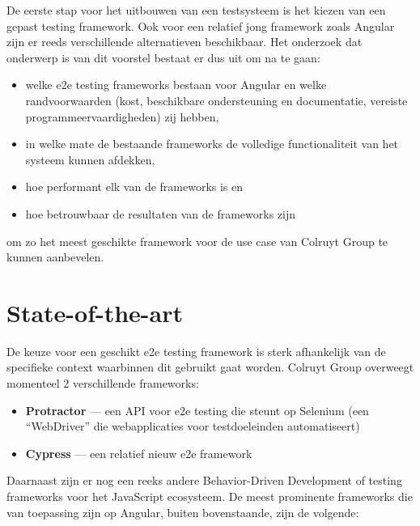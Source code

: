 De eerste stap voor het uitbouwen van een testsysteem is het kiezen van een gepast testing framework. Ook voor een relatief jong framework zoals Angular zijn er reeds verschillende alternatieven beschikbaar.
\vspace{\baselineskip}
Het onderzoek dat onderwerp is van dit voorstel bestaat er dus uit om na te gaan:

\begin{itemize}
    \item welke e2e testing frameworks bestaan voor Angular en welke randvoorwaarden (kost, beschikbare ondersteuning en documentatie, vereiste programmeervaardigheden) zij hebben,
    \item in welke mate de bestaande frameworks de volledige functionaliteit van het systeem kunnen afdekken,
    \item hoe performant elk van de frameworks is en
    \item hoe betrouwbaar de resultaten van de frameworks zijn
\end{itemize}

om zo het meest geschikte framework voor de use case van Colruyt Group te kunnen aanbevelen.


\section{State-of-the-art}
\label{sec:state-of-the-art}

De keuze voor een geschikt e2e testing framework is sterk afhankelijk van de specifieke context waarbinnen dit gebruikt gaat worden. Colruyt Group overweegt momenteel 2 verschillende frameworks:

\begin{itemize}
    \item \textbf{Protractor} — een API voor e2e testing die steunt op Selenium (een ``WebDriver'' die webapplicaties voor testdoeleinden automatiseert)
    \item \textbf{Cypress} — een relatief nieuw e2e framework
\end{itemize}

\vspace{\baselineskip}

Daarnaast zijn er nog een reeks andere Behavior-Driven Development of testing frameworks voor het JavaScript ecosysteem. De meest prominente frameworks die van toepassing zijn op Angular, buiten bovenstaande, zijn de volgende:

